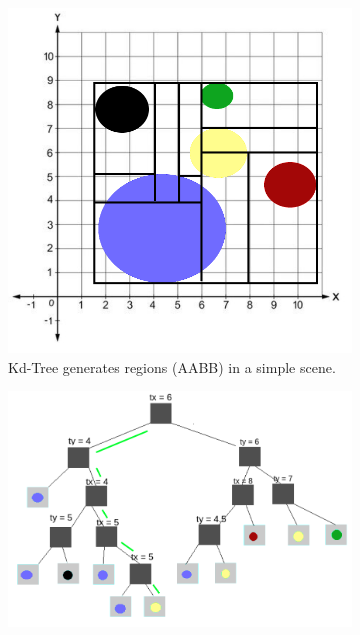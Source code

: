 \documentclass[11pt,a4paper]{article}
\begin{document}
\begin{figure}[H]	
     \centering
     \begin{subfigure}[b]{0.3\textwidth}
         \centering
         \captionsetup{justification=centering}
         \includegraphics[width=\textwidth]{images/kdtree/visaul_scene_1_new.png}
         \caption{Kd-Tree generates regions (AABB) in a simple scene.}
         \label{fig:pi_4000}
     \end{subfigure}
     \hfill
     \begin{subfigure}[b]{0.6\textwidth}
         \centering
         \captionsetup{justification=centering}
         \includegraphics[width=\textwidth]{images/kdtree/visaul_tree_11_new.png}

\end{subfigure}
\end{figure}
\end{document}
